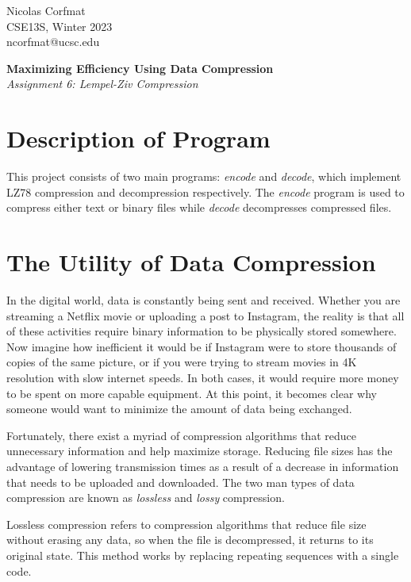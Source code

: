 \documentclass[12pt]{article}
\begin{document}
\flushright
Nicolas Corfmat \\CSE13S, Winter 2023 \\ ncorfmat@ucsc.edu

\flushleft
\LARGE
\textbf{Maximizing Efficiency Using Data Compression}
\large
\\\textit{Assignment 6: Lempel-Ziv Compression}

\section{Description of Program}
\normalsize

This project consists of two main programs: \textit{encode} and \textit{decode}, which implement LZ78 compression and decompression respectively. The \textit{encode} program is used to compress either text or binary files while \textit{decode} decompresses compressed files.


\section{The Utility of Data Compression}

In the digital world, data is constantly being sent and received. Whether you are streaming a Netflix movie or uploading a post to Instagram, the reality is that all of these activities require binary information to be physically stored somewhere. Now imagine how inefficient it would be if Instagram were to store thousands of copies of the same picture, or if you were trying to stream movies in 4K resolution with slow internet speeds. In both cases, it would require more money to be spent on more capable equipment. At this point, it becomes clear why someone would want to minimize the amount of data being exchanged.

\vspace{0.2in}

Fortunately, there exist a myriad of compression algorithms that reduce unnecessary information and help maximize storage. Reducing file sizes has the advantage of lowering transmission times as a result of a decrease in information that needs to be uploaded and downloaded. The two man types of data compression are known as \textit{lossless} and \textit{lossy} compression.

\vspace{0.6in}

Lossless compression refers to compression algorithms that reduce file size without erasing any data, so when the file is decompressed, it returns to its original state. This method works by replacing repeating sequences with a single code.
\end{document}
